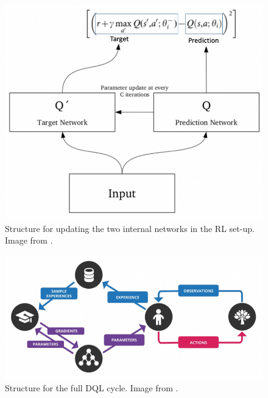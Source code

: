 \documentclass[runningheads,envcountsect]{llncs}
\begin{document}
\begin{figure}[t]
  \centering
  \includegraphics[scale=0.5]{img/rl_double_model.png}
  \caption{Structure for updating the two internal networks in the RL set-up. Image from \cite{dql_guide}.}
  \label{fig:rl_dm}
\end{figure}

\begin{figure}[t]
  \centering
  \includegraphics[scale=0.6]{img/dql_full.png}
  \caption{Structure for the full DQL cycle. Image from \cite{dql_guide}.}
  \label{fig:dql_full}
\end{figure}
\end{document}
